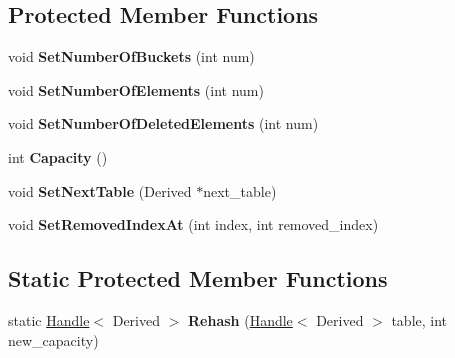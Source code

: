 \subsection*{Protected Member Functions}
\begin{DoxyCompactItemize}
\item 
void {\bfseries Set\+Number\+Of\+Buckets} (int num)\hypertarget{classv8_1_1internal_1_1_ordered_hash_table_a819a18b9aa192827c4fea4111a8c0a88}{}\label{classv8_1_1internal_1_1_ordered_hash_table_a819a18b9aa192827c4fea4111a8c0a88}

\item 
void {\bfseries Set\+Number\+Of\+Elements} (int num)\hypertarget{classv8_1_1internal_1_1_ordered_hash_table_aaa723dbd0f5779aa070be27117a7b435}{}\label{classv8_1_1internal_1_1_ordered_hash_table_aaa723dbd0f5779aa070be27117a7b435}

\item 
void {\bfseries Set\+Number\+Of\+Deleted\+Elements} (int num)\hypertarget{classv8_1_1internal_1_1_ordered_hash_table_ad7e78c9f7eb88a50311c8d418c36df9f}{}\label{classv8_1_1internal_1_1_ordered_hash_table_ad7e78c9f7eb88a50311c8d418c36df9f}

\item 
int {\bfseries Capacity} ()\hypertarget{classv8_1_1internal_1_1_ordered_hash_table_aaa1b61b524629dc64cecce1e9d9d5a17}{}\label{classv8_1_1internal_1_1_ordered_hash_table_aaa1b61b524629dc64cecce1e9d9d5a17}

\item 
void {\bfseries Set\+Next\+Table} (Derived $\ast$next\+\_\+table)\hypertarget{classv8_1_1internal_1_1_ordered_hash_table_a01b108313d38603b2d80c8aa6f61fa1b}{}\label{classv8_1_1internal_1_1_ordered_hash_table_a01b108313d38603b2d80c8aa6f61fa1b}

\item 
void {\bfseries Set\+Removed\+Index\+At} (int index, int removed\+\_\+index)\hypertarget{classv8_1_1internal_1_1_ordered_hash_table_a1d15ff76863adae785c350205f6e36e2}{}\label{classv8_1_1internal_1_1_ordered_hash_table_a1d15ff76863adae785c350205f6e36e2}

\end{DoxyCompactItemize}
\subsection*{Static Protected Member Functions}
\begin{DoxyCompactItemize}
\item 
static \hyperlink{classv8_1_1internal_1_1_handle}{Handle}$<$ Derived $>$ {\bfseries Rehash} (\hyperlink{classv8_1_1internal_1_1_handle}{Handle}$<$ Derived $>$ table, int new\+\_\+capacity)\hypertarget{classv8_1_1internal_1_1_ordered_hash_table_aec4e604abde7239be1b3645c38854431}{}\label{classv8_1_1internal_1_1_ordered_hash_table_aec4e604abde7239be1b3645c38854431}

\end{DoxyCompactItemize}
